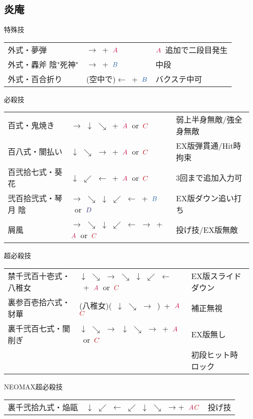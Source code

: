 \documentclass[a4j,11pt]{jarticle}
\def\A{$\textcolor{Acolor}{A}$}
\def\C{$\textcolor{Ccolor}{C}$}
\def\B{$\textcolor{Bcolor}{B}$}
\def\D{$\textcolor{Dcolor}{D}$}
\def\hado{$\downarrow$ $\searrow$ $\rightarrow$}%
\def\tatsu{$\downarrow$ $\swarrow$ $\leftarrow$}%
\def\syoryu{$\rightarrow$ $\downarrow$ $\searrow$}%
\def\gyakuyoga{$\rightarrow$ $\searrow$ $\downarrow$ $\swarrow$ $\leftarrow$}%
\def\tenti{$\rightarrow$ $\searrow$ $\downarrow$ $\swarrow$ $\leftarrow$ $\rightarrow$}%
\def\ryuko{$\downarrow$ $\searrow$ $\rightarrow$ $\searrow$ $\downarrow$ $\swarrow$ $\leftarrow$}%
\def\orochi{$\downarrow$ $\swarrow$ $\leftarrow$ $\swarrow$ $\downarrow$ $\searrow$ $\rightarrow$}%
\begin{document}
\subsection{炎庵}
\begin{itembox}[l]{特殊技}
\begin{tabular}{lll}
外式・夢弾&$\rightarrow$\ +\ \A&\A\ 追加で二段目発生\\
外式・轟斧 陰"死神"&$\rightarrow$\ +\ \B&中段\\%
外式・百合折り&(空中で)$\leftarrow$\ +\ \B&バクステ中可%
\end{tabular}
\end{itembox}
\begin{itembox}[l]{必殺技}
\begin{tabular}{lll}
百式・鬼焼き&\syoryu\ +\ \A\ or\ \C&弱上半身無敵/強全身無敵\\%
百八式・闇払い&\hado\ +\ \A\ or\ \C&EX版弾貫通/Hit時拘束\\%
百弐拾七式・葵花&\tatsu\ +\ \A\ or\ \C&3回まで追加入力可\\%
弐百拾弐式・琴月 陰&\gyakuyoga\ +\ \B\ or\ \D&EX版ダウン追い打ち\\%
屑風&\tenti\ +\ \A\ or\ \C&投げ技/EX版無敵%
\end{tabular}
\end{itembox}
\begin{itembox}[l]{超必殺技}
\begin{tabular}{lll}
禁千弐百十壱式・八稚女&\ryuko\ +\ \A\ or\ \C&EX版スライドダウン\\%
裏参百壱拾六式・豺華&(八稚女)(\ \hado\ )\times 4\ +\ \A\C&補正無視\\
裏千弐百七式・闇削ぎ&\hado\ \hado\ +\ \A\ or\ \C&EX版無し\\
&&初段ヒット時ロック%
\end{tabular}
\end{itembox}
\begin{itembox}[l]{NEOMAX超必殺技}
\begin{tabular}{lll}
裏千弐拾九式・焔甌&\orochi +\ \A\C&投げ技%
\end{tabular}
\end{itembox}
\newpage
\end{document}
